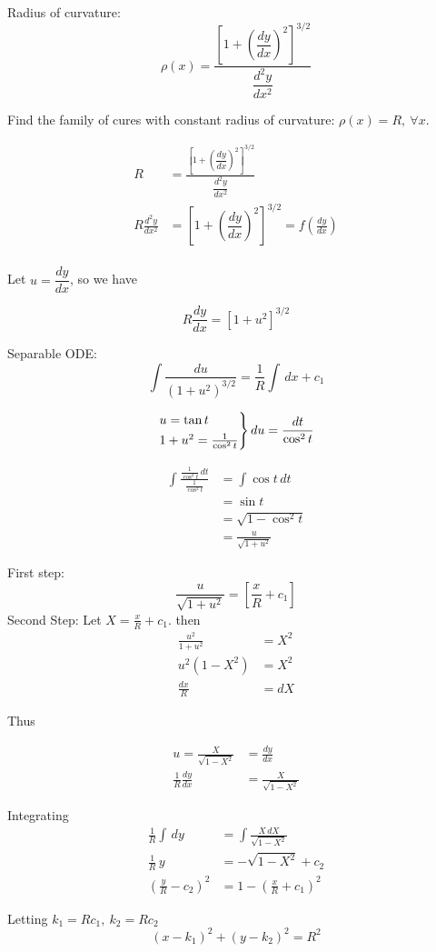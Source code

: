 \documentclass[twoside]{scrartcl}
\begin{document}
\begin{example}[Geometry]
Radius of curvature: 
\[\rho(x) = \frac{\left[1 + \left(\dfrac{dy}{dx}\right)^2\right]^{3/2}}{\dfrac{d^2y}{dx^2}}\]

Find the family of cures with constant radius of curvature: $\rho(x) = R,~\forall x$. 

\[
\begin{aligned}
  R &= \frac{\left[1 + \left(\dfrac{dy}{dx}\right)^2\right]^{3/2}}{\dfrac{d^2y}{dx^2}}\\
  R\frac{d^2y}{dx^2} &= \left[1 + \left(\dfrac{dy}{dx}\right)^2\right]^{3/2} = f\left(\frac{dy}{dx}\right)\\
\end{aligned}
\]

Let $u = \dfrac{dy}{dx}$, so we have

\[R\frac{dy}{dx} = [1 + u^2]^{3/2}\]

Separable ODE: 
\[\int \frac{du}{(1+u^2)^{3/2}} = \frac{1}{R}\int \,dx + c_1\]

\[\begin{rcases*}
u = \tan t\\
1 + u^2 = \frac{1}{\cos^2t}	
\end{rcases*} du = \frac{dt}{\cos^2t}
\]

\[
\begin{aligned}
  \int \frac{\frac{1}{\cos^2t}\,dt}{\frac{1}{\cos^2t}} &= \int \cos t\,dt\\
  &= \sin t\\
  &= \sqrt{1-\cos^2t}\\
  &= \frac{u}{\sqrt{1+u^2}}
\end{aligned}
\]

First step:
\[\frac{u}{\sqrt{1+u^2}} = \left[\frac{x}{R}+c_1\right]\]
Second Step:
Let $X = \frac{x}{R} + c_1$. then 
\setlength{\jot}{8pt}
\[
\begin{aligned}
  \frac{u^2}{1+u^2} &= X^2\\
  u^2(1-X^2) &= X^2\\
  \frac{dx}{R} &= dX
\end{aligned}
\]

Thus

\setlength{\jot}{8pt}
\[
\begin{aligned}
  u = \frac{X}{\sqrt{1-X^2}} &= \frac{dy}{dx}\\
  \frac{1}{R}\frac{dy}{dx} &= \frac{X}{\sqrt{1-X^2}}
  \end{aligned}
  \]
  
Integrating
  \[\begin{aligned}  
  \frac{1}{R}\int\,dy &= \int \frac{X\,dX}{\sqrt{1-X^2}}\\
    \frac{1}{R}\, y &= -\sqrt{1-X^2} + c_2\\
  \left(\frac{y}{R}-c_2\right)^2 &= 1-\left(\frac{x}{R} + c_1\right)^2
\end{aligned}
\]

Letting $k_1 = Rc_1,~ k_2 = Rc_2$
\[(x-k_1)^2 + (y-k_2)^2 = R^2\]
	
\end{example}~
\end{document}
